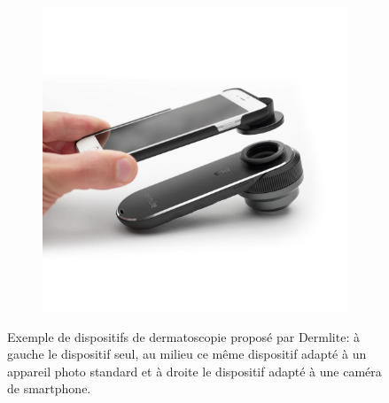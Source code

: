 \begin{figure}[H]
\begin{subfigure}{.33\textwidth}
    \end{subfigure}
    \begin{subfigure}{.33\textwidth}
      \centering
      \includegraphics[width=\linewidth]{contents/chapter_2/resources/dermatoscope_example_3.png}
    \end{subfigure}
    \caption{Exemple de dispositifs de dermatoscopie proposé par Dermlite: à gauche le dispositif seul, au milieu ce même dispositif adapté à un appareil photo standard et à droite le dispositif adapté à une caméra de smartphone.}
    \label{fig:dermatoscope_example}
\end{figure}\par

